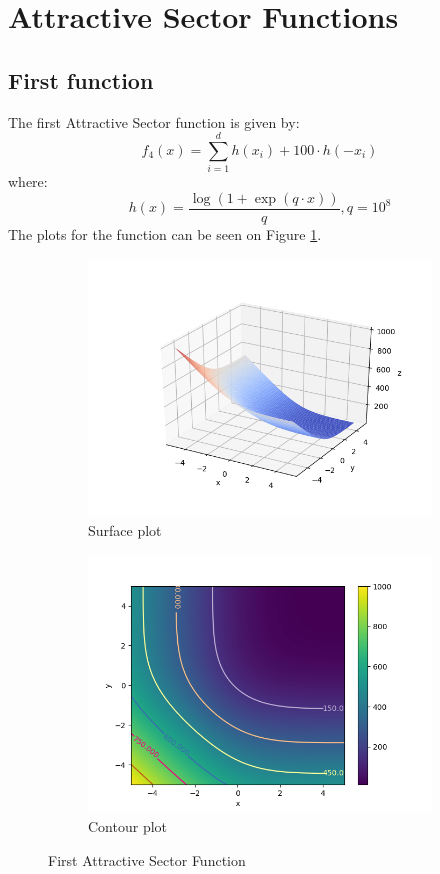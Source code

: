 \documentclass[a4paper]{article}
\begin{document}
\section{Attractive Sector Functions}
\label{sec:attractive}
\subsection{First function}
The first Attractive Sector function is given by:
\[
f_{4}(x)=\sum_{i=1}^{d} h\left(x_{i}\right)+100 \cdot h\left(-x_{i}\right)
\]
where:
\[
h(x)=\frac{\log (1+\exp (q \cdot x))}{q}, q=10^{8}
\]
The plots for the function can be seen on Figure \ref{plt4}.
\begin{figure}[H]
  \centering
  \begin{subfigure}[b]{0.49\textwidth}
    \centering
    \includegraphics[width=\textwidth]{imgs/plt41}
    \caption{Surface plot}
  \end{subfigure}
  \begin{subfigure}[b]{0.49\textwidth}
    \centering
    \includegraphics[width=\textwidth]{imgs/plt42}
    \caption{Contour plot}
  \end{subfigure}
  \caption{First Attractive Sector Function}
  \label{plt4}
\end{figure}
\end{document}
